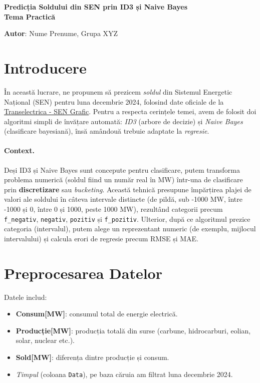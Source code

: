 \documentclass[12pt,a4paper]{article}
\begin{document}
\begin{center}
\Large \textbf{Predicția Soldului din SEN prin ID3 și Naive Bayes}\\[1em]
\large \textbf{Tema Practică}\\
\end{center}

\vspace{1em}

\textbf{Autor}: Nume Prenume, Grupa XYZ

\vspace{1.5em}

\section*{Introducere}

În această lucrare, ne propunem să prezicem \emph{soldul} din Sistemul Energetic Național (SEN) pentru luna decembrie 2024, folosind date oficiale de la \href{https://www.transelectrica.ro/widget/web/tel/sen-grafic/-/SENGrafic_WAR_SENGraficportlet}{Transelectrica - SEN Grafic}. Pentru a respecta cerințele temei, avem de folosit doi algoritmi simpli de învățare automată: \emph{ID3} (arbore de decizie) și \emph{Naive Bayes} (clasificare bayesiană), însă amândouă trebuie adaptate la \emph{regresie}.

\paragraph{Context.} Deși ID3 și Naive Bayes sunt concepute pentru clasificare, putem transforma problema numerică (soldul fiind un număr real în MW) într-una de clasificare prin \textbf{discretizare} sau \emph{bucketing}. Această tehnică presupune împărțirea plajei de valori ale soldului în câteva intervale distincte (de pildă, sub -1000 MW, între -1000 și 0, între 0 și 1000, peste 1000 MW), rezultând categorii precum \texttt{f\_negativ}, \texttt{negativ}, \texttt{pozitiv} și \texttt{f\_pozitiv}. Ulterior, după ce algoritmul prezice categoria (intervalul), putem alege un reprezentant numeric (de exemplu, mijlocul intervalului) și calcula erori de regresie precum RMSE și MAE.

\section*{Preprocesarea Datelor}

\noindent
Datele includ: 
\begin{itemize}
\item \textbf{Consum[MW]}: consumul total de energie electrică.
\item \textbf{Producție[MW]}: producția totală din surse (carbune, hidrocarburi, eolian, solar, nuclear etc.).
\item \textbf{Sold[MW]}: diferența dintre producție și consum.
\item \emph{Timpul} (coloana \texttt{Data}), pe baza căruia am filtrat luna decembrie 2024.
\end{itemize}
\end{document}
